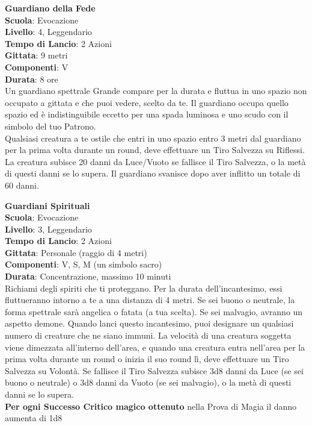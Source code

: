 \begin{multicols}{2}
\medskip\textbf{Guardiano della Fede}\\
\textbf{Scuola}: Evocazione\\
\textbf{Livello}: 4, Leggendario\\
\textbf{Tempo di Lancio}: 2 Azioni\\
\textbf{Gittata}: 9 metri\\
\textbf{Componenti}: V\\
\textbf{Durata}: 8 ore\\
Un guardiano spettrale Grande compare per la durata e fluttua in uno spazio non occupato a gittata e che puoi vedere, scelto da te. Il guardiano occupa quello spazio ed è indistinguibile eccetto per una spada luminosa e uno scudo con il simbolo del tuo Patrono.\\
Qualsiasi creatura a te ostile che entri in uno spazio entro 3 metri dal guardiano per la prima volta durante un round, deve effettuare un Tiro Salvezza su Riflessi. La creatura subisce 20 danni da Luce/Vuoto se fallisce il Tiro Salvezza, o la metà di questi danni se lo supera. Il guardiano svanisce dopo aver inflitto un totale di 60 danni.

\medskip\textbf{Guardiani Spirituali}\\
\textbf{Scuola}: Evocazione\\
\textbf{Livello}: 3, Leggendario\\
\textbf{Tempo di Lancio}: 2 Azioni\\
\textbf{Gittata}: Personale (raggio di 4 metri)\\
\textbf{Componenti}: V, S, M (un simbolo sacro)\\
\textbf{Durata}: Concentrazione, massimo 10 minuti\\
Richiami degli spiriti che ti proteggano. Per la durata dell'incantesimo, essi fluttueranno intorno a te a una distanza di 4 metri. Se sei buono o neutrale, la forma spettrale sarà angelica o fatata (a tua scelta). Se sei malvagio, avranno un aspetto demone. Quando lanci questo incantesimo, puoi designare un qualsiasi numero di creature che ne siano immuni. La velocità di una creatura soggetta viene dimezzata all'interno dell'area, e quando una creatura entra nell'area per la prima volta durante un round o inizia il suo round lì, deve effettuare un Tiro Salvezza su Volontà. Se fallisce il Tiro Salvezza subisce 3d8 danni da Luce (se sei buono o neutrale) o 3d8 danni da Vuoto (se sei malvagio), o la metà di questi danni se lo supera.\\
\textbf{Per ogni Successo Critico magico ottenuto} nella Prova di Magia il danno aumenta di 1d8 \\


\end{multicols}
